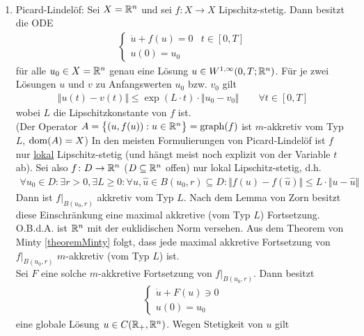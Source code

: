 \begin{korollar}\
\begin{enumerate}[label=(\alph*)]
\item Picard-Lindelöf: Sei $X=\mathbb{R}^n$ und sei $f:X\to X$ Lipschitz-stetig. Dann besitzt die ODE
\begin{align*}
\left\lbrace\begin{array}{rr}
\dot{u}+f(u)=0 & t\in[0,T]\\
u(0)=u_0
\end{array}\right.
\end{align*}
für alle $u_0\in X=\mathbb{R}^n$ genau eine Lösung $u\in W^{1,\infty}(0,T;\mathbb{R}^n)$. Für je zwei Lösungen $u$ und $v$ zu Anfangswerten $u_0$ bzw. $v_0$ gilt
\begin{align*}
\big\Vert u(t)-v(t)\big\Vert\leq\exp(L\cdot t)\cdot\big\Vert u_0-v_0\big\Vert\qquad\forall t\in[0,T]
\end{align*}
wobei $L$ die Lipschitzkonstante von $f$ ist.\\
(Der Operator $A=\big\lbrace(u,f(u)):u\in\mathbb{R}^n\big\rbrace=\operatorname{graph}(f)$ ist $m$-akkretiv vom Typ $L$, $\operatorname{dom}(A)=X$)\nl
In den meisten Formulierungen von Picard-Lindelöf ist $f$ nur \ul{lokal} Lipschitz-stetig (und hängt meist noch explizit von der Variable $t$ ab). Sei also $f\colon D\to\mathbb{R}^n$ ($D\subseteq \mathbb{R}^n$ offen) nur lokal Lipschitz-stetig, d.h. 
\begin{align*}
\forall u_0\in D:\exists r>0,\exists L\geq0:\forall u,\hat{u}\in B(u_0,r)\subseteq D:\big\Vert f(u)-f(\hat{u})\big\Vert\leq L\cdot\big\Vert u-\hat{u}\big\Vert
\end{align*}
Dann ist $f|_{B(u_0,r)}$ akkretiv vom Typ $L$. Nach dem Lemma von Zorn besitzt diese Einschränkung eine maximal akkretive (vom Typ $L$) Fortsetzung.\\
O.B.d.A. ist $\mathbb{R}^n$ mit der euklidischen Norm versehen. Aus dem Theorem von Minty \ref{theoremMinty} folgt, dass jede maximal akkretive Fortsetzung von $f|_{B(u_0,r)}$ $m$-akkretiv (vom Typ $L$) ist.\\
Sei $F$ eine solche $m$-akkretive Fortsetzung von $f|_{B(u_0,r)}$. Dann besitzt 
\begin{align*}
\left\lbrace\begin{array}{r}
\dot{u}+F(u)\ni 0\\
u(0)=u_0
\end{array}\right.
\end{align*}
eine globale Lösung $u\in C(\mathbb{R}_+,\mathbb{R}^n)$. Wegen Stetigkeit von $u$ gilt
\begin{align*}

\end{align*}
\end{enumerate}
\end{korollar}
